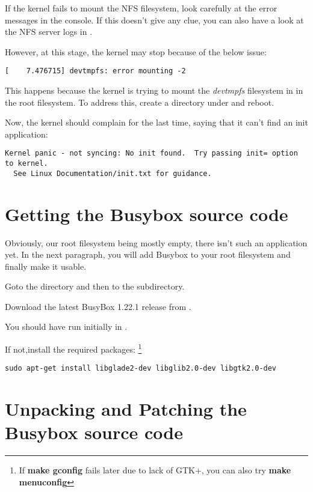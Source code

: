 If the kernel fails to mount the NFS filesystem, look carefully at the
error messages in the console. If this doesn't give any clue, you can
also have a look at the NFS server logs in .

However, at this stage, the kernel may stop because of the below
issue:

\begin{verbatim}
[    7.476715] devtmpfs: error mounting -2
\end{verbatim}

This happens because the kernel is trying to mount the {\em devtmpfs}
filesystem in  in the root filesystem. To address this,
create a  directory under  and reboot.

Now, the kernel should complain for the last time, saying that it can't
find an init application:

\footnotesize
\begin{verbatim}
Kernel panic - not syncing: No init found.  Try passing init= option to kernel.
  See Linux Documentation/init.txt for guidance.
\end{verbatim}
\normalsize
\clearpage

\section{Getting the Busybox source code}

Obviously, our root filesystem being mostly empty, there isn't such an
application yet. In the next paragraph, you will add Busybox to your root
filesystem and finally make it usable.

Goto the \labdir directory and then to the  subdirectory.

Download the latest BusyBox 1.22.1 release from .

You should have run  initially in \labdir.

If not,install the required packages:
\footnote{If {\bf make gconfig} fails later due to lack of GTK+, you can also try {\bf make menuconfig}}

\begin{verbatim}
sudo apt-get install libglade2-dev libglib2.0-dev libgtk2.0-dev
\end{verbatim}

\section{Unpacking and Patching the Busybox source code}

